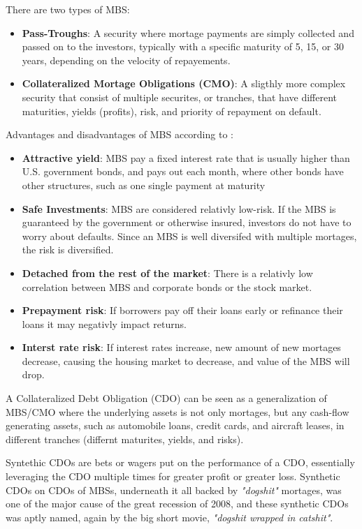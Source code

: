 There are two types of MBS:
\begin{itemize}
    \item \textbf{Pass-Troughs}: A security where mortage payments are simply collected and passed on to the investors, typically with a specific maturity of 5, 15, or 30 years, depending on the velocity of repayements.
    \item  \textbf{Collateralized Mortage Obligations (CMO)}: A sligthly more complex security that consist of multiple securites, or tranches, that have  different maturities, yields (profits), risk, and priority of repayment on default.
\end{itemize}

Advantages and disadvantages of MBS according to \textcite{MBSInvestopedia}:
\begin{itemize}
    \item \textbf{Attractive yield}: MBS pay a fixed interest rate that is usually higher than U.S. government bonds, and pays out each month, where other bonds have other structures, such as one single payment at maturity 
    \item \textbf{Safe Investments}: MBS are considered relativly low-risk. If the MBS is guaranteed by the government or otherwise insured, investors do not have to worry about defaults. Since an MBS is well diversifed with multiple mortages, the risk is diversified. 
    \item \textbf{Detached from the rest of the market}: There is a relativly low correlation between MBS and corporate bonds or the stock market.
    \item \textbf{Prepayment risk}: If borrowers pay off their loans early or refinance their loans it may negativly impact returns. 
    \item \textbf{Interst rate risk}: If interest rates increase, new amount of new mortages decrease, causing the housing market to decrease, and value of the MBS will drop.
\end{itemize}

A Collateralized Debt Obligation (CDO) can be seen as a generalization of MBS/CMO where the underlying assets is not only mortages, but any cash-flow generating assets, such as automobile loans, credit cards, and aircraft leases, in different tranches (differnt maturites, yields, and risks).

Syntethic CDOs are bets or wagers put on the performance of a CDO, essentially leveraging the CDO multiple times for greater profit or greater loss. Synthetic CDOs on CDOs of MBSs, underneath it all backed by \textit{"dogshit"} mortages, was one of the major cause of the great recession of 2008, and these synthetic CDOs was aptly named, again by the big short movie, \textit{"dogshit wrapped in catshit"}. 


